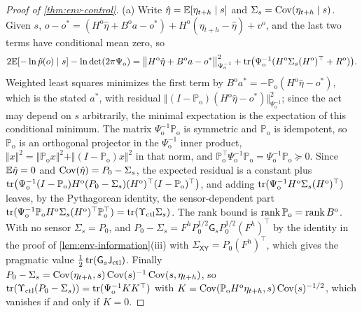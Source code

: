 \begin{proof}[Proof of \cref{thm:env-control}]
(a) Write $\hat\eta=\mathbb{E}[\eta_{t+h}\mid s]$ and $\Sigma_s=\operatorname{Cov}(\eta_{t+h}\mid s)$. Given $s$, $o-o^\ast=(H^{\mathrm o}\hat\eta+B^{\mathrm o}a-o^\ast)+H^{\mathrm o}(\eta_{t+h}-\hat\eta)+v^{\mathrm o}$, and the last two terms have conditional mean zero, so
\[
2\mathbb{E}[-\ln\tilde p(o)\mid s]-\ln\det(2\pi\Psi_{\mathrm o})=\bigl\Vert H^{\mathrm o}\hat\eta+B^{\mathrm o}a-o^\ast\bigr\Vert^2_{\Psi_{\mathrm o}^{-1}}+\operatorname{tr}\bigl(\Psi_{\mathrm o}^{-1}(H^{\mathrm o}\Sigma_s(H^{\mathrm o})^\top+R^{\mathrm o})\bigr).
\]
Weighted least squares minimizes the first term by $B^{\mathrm o}a^\ast=-\mathbb P_{\mathrm o}(H^{\mathrm o}\hat\eta-o^\ast)$, which is the stated $a^\ast$, with residual $\Vert(I-\mathbb P_{\mathrm o})(H^{\mathrm o}\hat\eta-o^\ast)\Vert^2_{\Psi_{\mathrm o}^{-1}}$; since the act may depend on $s$ arbitrarily, the minimal expectation is the expectation of this conditional minimum. The matrix $\Psi_{\mathrm o}^{-1}\mathbb P_{\mathrm o}$ is symmetric and $\mathbb P_{\mathrm o}$ is idempotent, so $\mathbb P_{\mathrm o}$ is an orthogonal projector in the $\Psi_{\mathrm o}^{-1}$ inner product, $\Vert x\Vert^2=\Vert\mathbb P_{\mathrm o}x\Vert^2+\Vert(I-\mathbb P_{\mathrm o})x\Vert^2$ in that norm, and $\mathbb P_{\mathrm o}^\top\Psi_{\mathrm o}^{-1}\mathbb P_{\mathrm o}=\Psi_{\mathrm o}^{-1}\mathbb P_{\mathrm o}\succeq0$. Since $\mathbb{E}\hat\eta=0$ and $\operatorname{Cov}(\hat\eta)=P_0-\Sigma_s$, the expected residual is a constant plus $\operatorname{tr}\bigl(\Psi_{\mathrm o}^{-1}(I-\mathbb P_{\mathrm o})H^{\mathrm o}(P_0-\Sigma_s)(H^{\mathrm o})^\top(I-\mathbb P_{\mathrm o})^\top\bigr)$, and adding $\operatorname{tr}(\Psi_{\mathrm o}^{-1}H^{\mathrm o}\Sigma_s(H^{\mathrm o})^\top)$ leaves, by the Pythagorean identity, the sensor-dependent part $\operatorname{tr}(\Psi_{\mathrm o}^{-1}\mathbb P_{\mathrm o}H^{\mathrm o}\Sigma_s(H^{\mathrm o})^\top\mathbb P_{\mathrm o}^\top)=\operatorname{tr}(\Upsilon_{\mathrm{ctl}}\Sigma_s)$. The rank bound is $\operatorname{rank}\mathbb P_{\mathrm o}=\operatorname{rank} B^{\mathrm o}$. With no sensor $\Sigma_s=P_0$, and $P_0-\Sigma_s=F^hP_0^{1/2}\mathsf G_sP_0^{1/2}(F^h)^\top$ by the identity in the proof of \cref{lem:env-information}(iii) with $\Sigma_{\mathsf X\mathsf Y}=P_0(F^h)^\top$, which gives the pragmatic value $\frac12\operatorname{tr}(\mathsf G_s\mathsf J_{\mathrm{ctl}})$. Finally $P_0-\Sigma_s=\operatorname{Cov}(\eta_{t+h},s)\operatorname{Cov}(s)^{-1}\operatorname{Cov}(s,\eta_{t+h})$, so $\operatorname{tr}(\Upsilon_{\mathrm{ctl}}(P_0-\Sigma_s))=\operatorname{tr}(\Psi_{\mathrm o}^{-1}KK^\top)$ with $K=\operatorname{Cov}(\mathbb P_{\mathrm o}H^{\mathrm o}\eta_{t+h},s)\operatorname{Cov}(s)^{-1/2}$, which vanishes if and only if $K=0$.


\end{proof}
